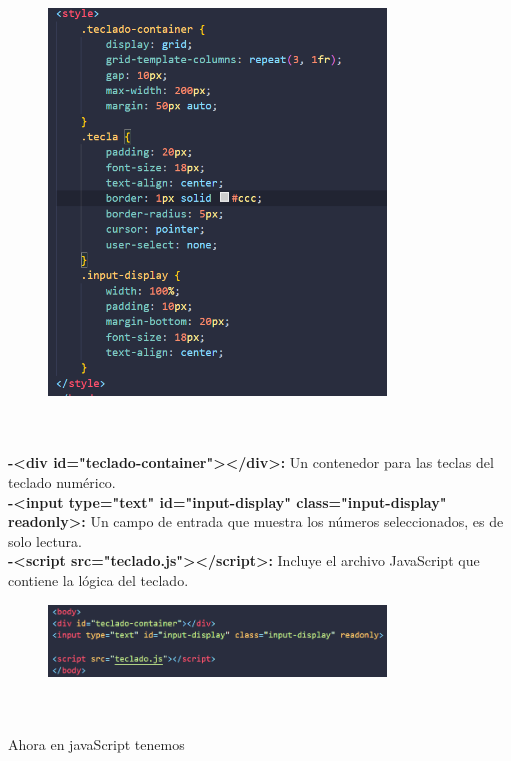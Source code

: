 \documentclass{article}
\begin{document}
    \begin{figure}[H]
		          \centering
		          \includegraphics[width=0.8\textwidth,keepaspectratio]                       {img/styleTeclado.png}
    \end{figure}
\\
\\\textbf{-<div id="teclado-container"></div>:} Un contenedor para las teclas del teclado numérico.
\\\textbf{-<input type="text" id="input-display" class="input-display" readonly>:} Un campo de entrada que muestra los números seleccionados, es de solo lectura.
\\\textbf{-<script src="teclado.js"></script>:} Incluye el archivo JavaScript que contiene la lógica del teclado.
    \begin{figure}[H]
		          \centering
		          \includegraphics[width=0.8\textwidth,keepaspectratio]                       {img/bodyTeclado.png}
    \end{figure}
\\
\\Ahora en javaScript tenemos
\end{document}
